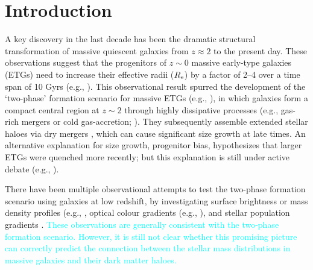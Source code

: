 \documentclass[a4paper,fleqn,usenatbib]{mnras}
\newcommand{\song}[1]{\textcolor{cyan}{#1}}
\begin{document}



\section{Introduction}
    \label{sec:intro}
    
    A key discovery in the last decade has been the dramatic structural transformation 
    of massive quiescent galaxies \citep[e.g.,][]{Trujillo2006, vanDokkum2008, 
    Cimatti2008, Damjanov2009, vanderWel2011, Szomoru2012, Patel2013} from 
    $z \approx 2$ to the present day. 
    These observations suggest that the progenitors of $z{\sim} 0$ massive early-type 
    galaxies (ETGs) need to increase their effective radii ($R_{\rm e}$) by a factor 
    of 2--4 over a time span of 10 Gyrs (e.g., \citealt{Newman2012, vdWel2014}). 
    This observational result spurred the development of the `two-phase' formation
    scenario for massive ETGs (e.g., \citealt{Oser2010, Oser2012}),
    in which galaxies form a compact central region at $z\sim 2$ through highly 
    dissipative processes (e.g., gas-rich mergers or cold gas-accretion;
    \citealt{Hopkins2008, Dekel2009}). 
    They subsequently assemble extended stellar haloes via dry mergers 
    \citep[e.g.,][]{Naab2006, Khochfar2006, Oser2010, Oser2012}, which can cause 
    significant size growth at late times. 
    An alternative explanation for size growth, progenitor bias, hypothesizes that 
    larger ETGs were quenched more recently; but this explanation is still under 
    active debate (e.g., \citealt{Newman2012, Carollo2013, Poggianti2013, Belli2015,
    Keating2015, Fagioli2016}). 
    
    There have been multiple observational attempts to test the two-phase 
    formation scenario using galaxies at low redshift, by investigating surface 
    brightness or mass density profiles (e.g., \citealt{Huang2013a, Huang2013b, 
    Oh2017}, optical colour gradients (e.g., \citealt{LaBarbera2010, LaBarbera2012}), 
    and stellar population gradients \citep[e.g.,][]{Coccato2010, Coccato2011, 
    Greene2015, Barbosa2016}. 
    \song{
    These observations are generally consistent with the two-phase formation scenario. 
    However, it is still not clear whether this promising picture can correctly 
    predict the connection between the stellar mass distributions in massive galaxies 
    and their dark matter haloes.
    }
    
\end{document}
